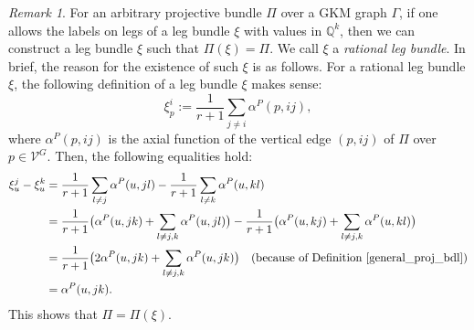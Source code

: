 \documentclass[12pt]{amsart}
\theoremstyle{definition}
\theoremstyle{remark}
\newtheorem{remark}[theorem]{Remark}
\numberwithin{equation}{section}
\begin{document}
\begin{remark}
For an arbitrary projective bundle $\Pi$ over a GKM graph $\Gamma$,
if one allows the labels on legs of a leg bundle $\xi$ with values in $\mathbb{Q}^k$, then we can construct a leg bundle $\xi$ such that $\Pi(\xi)=\Pi$.
We call $\xi$ a {\it rational leg bundle}.
In brief, the reason for the existence of such $\xi$ is as follows.
For a rational leg bundle $\xi$, the following definition of a leg bundle $\xi$ makes sense:
\[
\xi_{p}^{i}:=\frac{1}{r+1}\sum_{j\neq i} \alpha^{P}(p,ij),
\]
where $\alpha^{P}(p,ij)$ is the axial function of the vertical edge $(p,ij)$ of $\Pi$ over $p\in \mathcal{V}^{G}$.
Then, the following equalities hold:
\begin{align*}
\xi_{u}^{j}-\xi_{u}^{k}
&=\frac{1}{r+1} \sum_{l\neq j}\alpha^{P}(u,jl)-\frac{1}{r+1} \sum_{l\neq k}\alpha^{P}(u,kl) \\
&=\frac{1}{r+1}\bigl(\alpha^{P}(u,jk)+ \sum_{l\neq j,k}\alpha^{P}(u,jl)\bigr)-\frac{1}{r+1} \bigl(\alpha^{P}(u,kj)+\sum_{l\neq j,k}\alpha^{P}(u,kl)\bigr) \\
&=\frac{1}{r+1}\bigl(2\alpha^{P}(u,jk)+\sum_{l\neq j,k}\alpha^{P}(u,jk)\bigr)\quad (\text{because of Definition~\ref{general_proj_bdl}}) \\
&=\alpha^{P}(u,jk).
\end{align*}
This shows that $\Pi=\Pi(\xi)$.
\end{remark}
\end{document}
